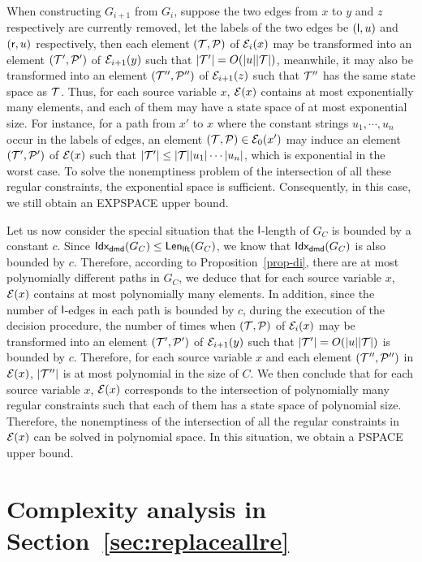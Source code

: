 When constructing $G_{i+1}$ from $G_i$, suppose the two edges from $x$ to $y$ and $z$ respectively are currently removed, let the labels of the two edges be $({\sf l}, u)$ and $({\sf r}, u)$ respectively, then each element $(\mathcal{T}, \mathcal{P})$ of $\mathcal{E}_i(x)$ may be transformed into an element $(\mathcal{T}', \mathcal{P}')$ of $\mathcal{E}_{i+1}(y)$ such that $|\mathcal{T}'| = O(|u||\mathcal{T}|)$, meanwhile, it may also be transformed into an element $(\mathcal{T}'', \mathcal{P}'')$ of $\mathcal{E}_{i+1}(z)$ such that $\mathcal{T}''$ has the same state space as $\mathcal{T}$. Thus, for each source variable $x$, $\mathcal{E}(x)$ contains at most exponentially many elements, and each of them may have a state space of at most exponential size. For instance, for a path from $x'$ to $x$ where the constant strings $u_1,\cdots, u_n$ occur in the labels of edges, an element $(\mathcal{T},\mathcal{P}) \in \mathcal{E}_0(x')$ may induce an element $(\mathcal{T}', \mathcal{P}')$ of $\mathcal{E}(x)$ such that $|\mathcal{T}'| \le |\mathcal{T}| |u_1| \cdots |u_n|$, which is exponential in the worst case. 
%
To solve the nonemptiness problem of the intersection of all these regular constraints, the exponential space is sufficient. Consequently, in this case, we still obtain an EXPSPACE upper bound. 

Let us now consider the special situation that the $\mathsf{l}$-length of $G_C$ is bounded by a constant $c$.
Since ${\sf Idx_{dmd}}(G_C) \le {\sf Len_{lft}}(G_C)$, we know that ${\sf Idx_{dmd}}(G_C)$ is also bounded by $c$. Therefore, according to Proposition~\ref{prop-di}, there are at most polynomially different paths in $G_C$, we deduce that for each source variable $x$, $\mathcal{E}(x)$ contains at most polynomially many elements. In addition, since the number of $\mathsf{l}$-edges in each path is bounded by $c$, during the execution of the decision procedure, the number of times when $(\mathcal{T}, \mathcal{P})$ of $\mathcal{E}_i(x)$ may be transformed into an element $(\mathcal{T}', \mathcal{P}')$ of $\mathcal{E}_{i+1}(y)$ such that $|\mathcal{T}'| = O(|u||\mathcal{T}|)$ is bounded by $c$.
Therefore, for each source variable $x$ and each element $(\mathcal{T}'', \mathcal{P}'')$ in $\mathcal{E}(x)$,  $|\mathcal{T}''|$ is at most polynomial in the size of $C$. We then conclude that for each source variable $x$, $\mathcal{E}(x)$ corresponds to the intersection of polynomially many regular constraints such that each of them has a state space of polynomial size. Therefore, the nonemptiness of the intersection of all the regular constraints in $\mathcal{E}(x)$ can be solved in polynomial space. In this situation, we obtain a PSPACE upper bound.


\def\refsecreplaceallre{\ref{sec:replaceallre}}
\section{Complexity analysis in Section~\protect\refsecreplaceallre}
\label{sec:re-complexity-full}

